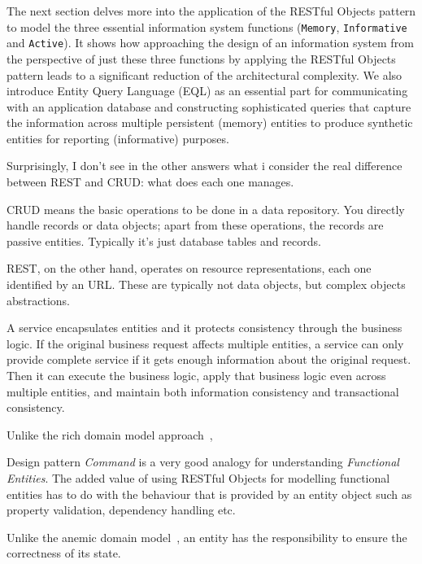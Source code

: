\documentclass[a4paper,12pt,oneside,openright,final]{memoir} %
\begin{document}
	The next section delves more into the application of the RESTful Objects pattern to model the three essential information system functions (\texttt{Memory}, \texttt{Informative} and \texttt{Active}).
	It shows how approaching the design of an information system from the perspective of just these three functions by applying the RESTful Objects pattern leads to a significant reduction of the architectural complexity.
	We also introduce Entity Query Language (EQL) as an essential part for communicating with an application database and constructing sophisticated queries that capture the information across multiple persistent (memory) entities to produce synthetic entities for reporting (informative) purposes.


\iffalse


	Surprisingly, I don't see in the other answers what i consider the real difference between REST and CRUD: what does each one manages.

	CRUD means the basic operations to be done in a data repository. You directly handle records or data objects; apart from these operations, the records are passive entities. Typically it's just database tables and records.

	REST, on the other hand, operates on resource representations, each one identified by an URL. These are typically not data objects, but complex objects abstractions.


	
	A service encapsulates entities and it protects consistency through the business logic. 
	If the original business request affects multiple entities, a service can only provide complete service if it gets enough information about the original request.
	Then it can execute the business logic, apply that business logic even across multiple entities, and maintain both information consistency and transactional consistency.
	
	

	Unlike the rich domain model approach~\cite{evans2003},
	
	
	Design pattern \emph{Command} is a very good analogy for understanding \emph{Functional Entities}.
	The added value of using RESTful Objects for modelling functional entities has to do with the behaviour that is provided by an entity object such as property validation, dependency handling etc.


	Unlike the anemic domain model~\cite{fowler2003}, an entity has the responsibility to ensure the correctness of its state.
	
\end{document}
